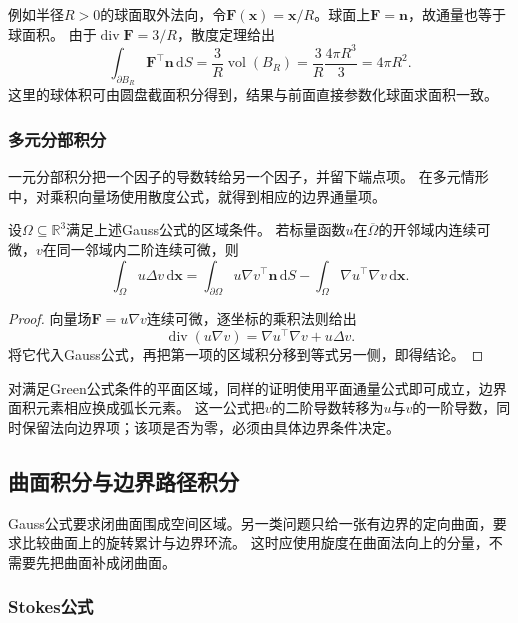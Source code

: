 例如半径$R>0$的球面取外法向，令$\bm F(\bm x)=\bm x/R$。球面上$\bm F=\bm n$，故通量也等于球面积。
由于$\operatorname{div}\bm F=3/R$，散度定理给出
\[
 \int_{\partial B_R}\bm F^\top\bm n\,\mathrm dS
 =\frac3R\operatorname{vol}(B_R)
 =\frac3R\frac{4\pi R^3}3=4\pi R^2.
\]
这里的球体积可由圆盘截面积分得到，结果与前面直接参数化球面求面积一致。

\subsubsection{多元分部积分}

一元分部积分把一个因子的导数转给另一个因子，并留下端点项。
在多元情形中，对乘积向量场使用散度公式，就得到相应的边界通量项。
\begin{theorem}[多元分部积分]
\label{thm:multivariable-integration-by-parts}
设$\Omega\subseteq\mathbb R^3$满足上述Gauss公式的区域条件。
若标量函数$u$在$\overline\Omega$的开邻域内连续可微，$v$在同一邻域内二阶连续可微，则
\[
 \int_\Omega u\Delta v\,\mathrm d\bm x
 =\int_{\partial\Omega}u\nabla v^\top\bm n\,\mathrm dS
  -\int_\Omega\nabla u^\top\nabla v\,\mathrm d\bm x.
\]
\end{theorem}
\begin{proof}
向量场$\bm F=u\nabla v$连续可微，逐坐标的乘积法则给出
\[
 \operatorname{div}(u\nabla v)
 =\nabla u^\top\nabla v+u\Delta v.
\]
将它代入Gauss公式，再把第一项的区域积分移到等式另一侧，即得结论。
\end{proof}
对满足Green公式条件的平面区域，同样的证明使用平面通量公式即可成立，边界面积元素相应换成弧长元素。
这一公式把$v$的二阶导数转移为$u$与$v$的一阶导数，同时保留法向边界项；该项是否为零，必须由具体边界条件决定。

\subsection{曲面积分与边界路径积分}

Gauss公式要求闭曲面围成空间区域。另一类问题只给一张有边界的定向曲面，要求比较曲面上的旋转累计与边界环流。
这时应使用旋度在曲面法向上的分量，不需要先把曲面补成闭曲面。

\subsubsection{Stokes公式}

